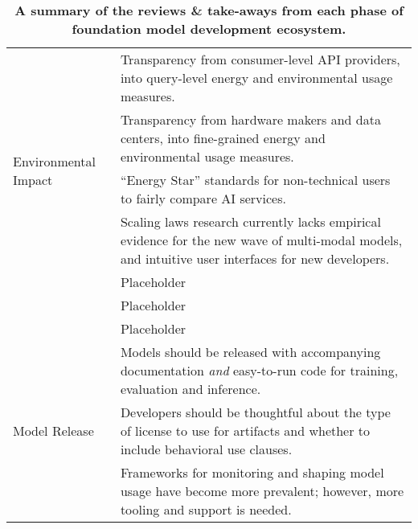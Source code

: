 \begin{table*}[t!]
\begin{adjustbox}{width=\textwidth}
\begin{tabular}{m{3cm} m{13cm}}
\midrule
\multirow{5}{*}{Environmental Impact} & Transparency from consumer-level API providers, into query-level energy and environmental usage measures. \\
& \cellcolor[gray]{0.9}Transparency from hardware makers and data centers, into fine-grained energy and environmental usage measures. \\
& ``Energy Star'' standards for non-technical users to fairly compare AI services. \\
& \cellcolor[gray]{0.9}Scaling laws research currently lacks empirical evidence for the new wave of multi-modal models, and intuitive user interfaces for new developers. \\
\midrule
\multirow{3}{*}{Model Evaluation} & Placeholder \\
& \cellcolor[gray]{0.9} Placeholder \\
& Placeholder \\
\midrule
\multirow{3}{*}{Model Release} & \cellcolor[gray]{0.9}Models should be released with accompanying documentation \emph{and} easy-to-run code for training, evaluation and inference. \\
& Developers should be thoughtful about the type of license to use for artifacts and whether to include behavioral use clauses. \\
&  \cellcolor[gray]{0.9} Frameworks for monitoring and shaping model usage have become more prevalent; however, more tooling and support is needed. \\

\bottomrule
\end{tabular}
\end{adjustbox}
\caption{\textbf{A summary of the reviews \& take-aways from each phase of foundation model development ecosystem.}}
\label{tab:review-summary}
\end{table*}

